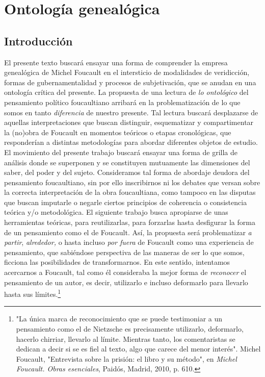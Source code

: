 \chapter{Ontología genealógica}

\section{Introducción}

El presente texto buscará ensayar una forma de comprender la empresa
genealógica de Michel Foucault en el intersticio de modalidades de
veridicción, formas de gubernamentalidad y procesos de subjetivación,
que se anudan en una ontología crítica del presente. La propuesta de una
lectura de \emph{lo ontológico} del pensamiento político foucaultiano
arribará en la problematización de lo que somos en tanto
\emph{diferencia} de nuestro presente. Tal lectura buscará desplazarse
de aquellas interpretaciones que buscan distinguir, esquematizar y
compartimentar la (no)obra de Foucault en momentos teóricos o etapas
cronológicas, que responderían a distintas metodologías para abordar
diferentes objetos de estudio. El movimiento del presente trabajo
buscará ensayar una forma de grilla de análisis donde se superponen y se
constituyen mutuamente las dimensiones del saber, del poder y del
sujeto. Consideramos tal forma de abordaje deudora del pensamiento
foucaultiano, sin por ello inscribirnos ni los debates que versan sobre
la correcta interpretación de la obra foucaultiana, como tampoco en las
disputas que buscan imputarle o negarle ciertos principios de coherencia
o consistencia teórica y/o metodológica. El siguiente trabajo busca
apropiarse de unas herramientas teóricas, para reutilizarlas, para
forzarlas hasta desfigurar la forma de un pensamiento como el de
Foucault. Así, la propuesta será problematizar \emph{a partir},
\emph{alrededor,} o hasta incluso \emph{por fuera} de Foucault como una
experiencia de pensamiento, que sabiéndose perspectiva de las maneras de
ser lo que somos, ficciona las posibilidades de transformarnos. En este
sentido, intentamos acercarnos a Foucault, tal como él consideraba la
mejor forma de \emph{reconocer} el pensamiento de un autor, es decir,
utilizarlo e incluso deformarlo para llevarlo hasta sus
límites.\footnote{"La única marca de reconocimiento que se puede
  testimoniar a un pensamiento como el de Nietzsche es precisamente
  utilizarlo, deformarlo, hacerlo chirriar, llevarlo al límite. Mientras
  tanto, los comentaristas se dedican a decir si se es fiel al texto,
  algo que carece del menor interés". Michel Foucault, "Entrevista sobre
  la prisión: el libro y su método", en \emph{Michel Foucault. Obras
  esenciales}, Paidós, Madrid, 2010, p. 610.}

